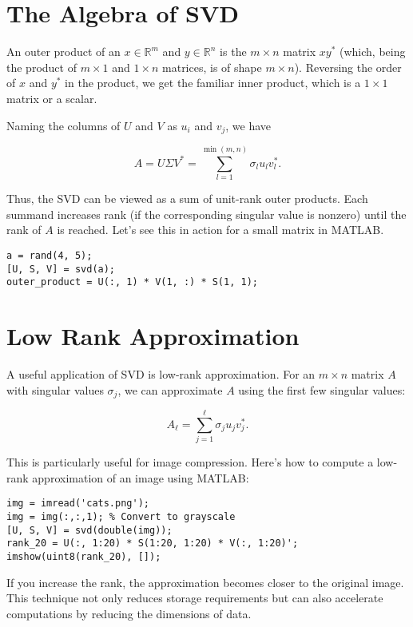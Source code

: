 \documentclass{ximera}
\begin{document}
\section{The Algebra of SVD}

An outer product of an \( x \in \mathbb{R}^m \) and \( y \in \mathbb{R}^n \) is the \( m \times n \) matrix \( x y^* \) (which, being the product of \( m \times 1 \) and \( 1 \times n \) matrices, is of shape \( m \times n \)). Reversing the order of \( x \) and \( y^* \) in the product, we get the familiar inner product, which is a \( 1 \times 1 \) matrix or a scalar.

Naming the columns of \( U \) and \( V \) as \( u_i \) and \( v_j \), we have

\[
A = U \Sigma V^* = \sum_{l=1}^{\min(m,n)} \sigma_l u_l v_l^*.
\]

Thus, the SVD can be viewed as a sum of unit-rank outer products. Each summand increases rank (if the corresponding singular value is nonzero) until the rank of \( A \) is reached. Let's see this in action for a small matrix in MATLAB.

\begin{verbatim}
a = rand(4, 5);
[U, S, V] = svd(a);
outer_product = U(:, 1) * V(1, :) * S(1, 1);
\end{verbatim}

\section{Low Rank Approximation}

A useful application of SVD is low-rank approximation. For an \( m \times n \) matrix \( A \) with singular values \( \sigma_j \), we can approximate \( A \) using the first few singular values:

\[
A_\ell = \sum_{j=1}^\ell \sigma_j u_j v_j^*.
\]

This is particularly useful for image compression. Here’s how to compute a low-rank approximation of an image using MATLAB:

\begin{verbatim}
img = imread('cats.png');
img = img(:,:,1); % Convert to grayscale
[U, S, V] = svd(double(img));
rank_20 = U(:, 1:20) * S(1:20, 1:20) * V(:, 1:20)';
imshow(uint8(rank_20), []);
\end{verbatim}

If you increase the rank, the approximation becomes closer to the original image. This technique not only reduces storage requirements but can also accelerate computations by reducing the dimensions of data.
\end{document}
